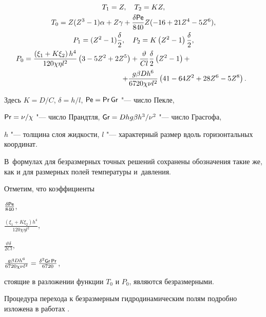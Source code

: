 \begin{gather}

T_1=Z, \quad T_2=K Z,

\\

T_0=\displaystyle Z(Z^3-1)\alpha+Z\gamma+\frac{\delta {\sf Pe}}{840}Z(-16+21Z^4-5Z^6),

\\

P_1=(Z^2-1 )\frac{\delta}{2}, \quad P_2=K\left(Z^2-1 \right)\frac{\delta}{2},

\\

P_0=\displaystyle \frac{\left(\xi_1+K\xi_2\right)h^4}{120\chi\eta l^2}\left(3-5Z^2+2Z^5\right)+\frac{\vartheta}{Cl}\frac{\delta}{2} \left(Z^2-1\right)+\hspace{3cm}\\

\hspace{5cm}+\displaystyle \frac{g\beta Dh^6}{6720\chi\nu l^2}\left(41-64Z^2+28Z^6-5Z^8\right).

\end{gather}

Здесь $K=D/C$, $\delta=h/l$, ${\sf Pe}={\sf Pr}\, {\sf Gr}$ "--- число Пекле, 

${\sf Pr}={\nu}/{\chi}$ "--- число Прандтля, ${\sf Gr}={Dhg\beta h^3}/{\nu^2}$ "--- число Грасгофа, 

$h$ "--- толщина слоя жидкости, $l$ "--- характерный размер вдоль горизонтальных координат. 

В~формулах для безразмерных точных решений сохранены обозначения такие же, как и для размерных полей температуры и~давления. 

Отметим, что коэффициенты 

$\frac{\delta {\sf Pe}}{840}$, 

$\frac{(\xi_1+K\xi_2) h^4}{ 120\chi\eta l^2}$, 

$\frac{\vartheta\delta}{2Cl}$, 

$\frac{g\beta Dh^6}{6720\chi\nu l^2}=\frac{\delta^2{\sf Gr\,Pr}}{6720}$, 

стоящие в разложении функции $T_0$ и $P_0$, являются безразмерными.

Процедура перехода к безразмерным гидродинамическим полям подробно изложена в работах \cite{Burm_Pros_Samara, Burm_Pros_IOP, Burm_Pros_DREAM, Burm_Pros_AIP}.



\smallskip





